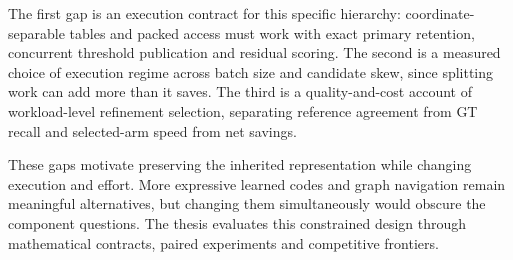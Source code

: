 The first gap is an execution contract for this specific hierarchy:
coordinate-separable tables and packed access must work with exact
primary retention, concurrent threshold publication and residual scoring.
The second is a measured choice of execution regime across batch size and
candidate skew, since splitting work can add more than it saves. The third
is a quality-and-cost account of workload-level refinement selection,
separating reference agreement from GT recall and selected-arm speed from
net savings.

These gaps motivate preserving the inherited representation while changing
execution and effort. More expressive learned codes and graph navigation
remain meaningful alternatives, but changing them simultaneously would
obscure the component questions. The thesis evaluates this constrained
design through mathematical contracts, paired experiments and competitive
frontiers.
